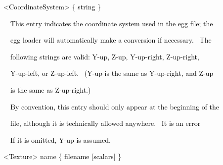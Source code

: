\documentclass[a4paper]{article}
\newcommand\textstyleOOoComputerKeyWord[1]{\textrm{\textcolor[rgb]{0.0,0.0,0.5019608}{#1}}}
\newcommand\textstyleOOoAssemblerSpecialChar[1]{\textrm{\textcolor[rgb]{0.0,0.5019608,0.0}{#1}}}
\newcommand\textstyleOOoAssemblerIdent[1]{\textrm{\textcolor{black}{#1}}}
\newcommand\textstyleOOoAssemblerDirective[1]{\textrm{\textcolor[rgb]{0.0,0.5019608,1.0}{#1}}}
\begin{document}
\bigskip


\bigskip

{\color{black}
\textstyleOOoAssemblerSpecialChar{{\textless}}\textstyleOOoAssemblerIdent{CoordinateSystem}\textstyleOOoAssemblerSpecialChar{{\textgreater}}\textstyleOOoComputerKeyWord{\textcolor{black}{
}}\textstyleOOoAssemblerSpecialChar{\{}\textstyleOOoComputerKeyWord{\textcolor{black}{
}}\textstyleOOoAssemblerIdent{string}\textstyleOOoComputerKeyWord{\textcolor{black}{
}}\textstyleOOoAssemblerSpecialChar{\}}}


\bigskip

{\color{black}
\textstyleOOoComputerKeyWord{\textcolor{black}{\ \ This entry indicates the coordinate system used in the egg file;
the}}}

{\color{black}
\textstyleOOoComputerKeyWord{\textcolor{black}{\ \ egg loader will automatically make a conversion if necessary.
\ The}}}

{\color{black}
\textstyleOOoComputerKeyWord{\textcolor{black}{\ \ following strings are valid: Y-up, Z-up, Y-up-right, Z-up-right,}}}

{\color{black}
\textstyleOOoComputerKeyWord{\textcolor{black}{\ \ Y-up-left, or Z-up-left. \ (Y-up is the same as Y-up-right, and
Z-up}}}

{\color{black}
\textstyleOOoComputerKeyWord{\textcolor{black}{\ \ is the same as Z-up-right.)}}}


\bigskip

{\color{black}
\textstyleOOoComputerKeyWord{\textcolor{black}{\ \ By convention, this entry should only appear at the beginning of
the}}}

{\color{black}
\textstyleOOoComputerKeyWord{\textcolor{black}{\ \ file, although it is technically allowed anywhere. \ It is an
error}}}

\clearpage{\color{black}
\textstyleOOoComputerKeyWord{\textcolor{black}{\ \ to include more than one coordinate system entry in the same file.}}}

{\color{black}
\textstyleOOoComputerKeyWord{\textcolor{black}{\ \ If it is omitted, Y-up is assumed.}}}


\bigskip


\bigskip

{\color{black}
\textstyleOOoAssemblerSpecialChar{{\textless}}\textstyleOOoAssemblerIdent{Texture}\textstyleOOoAssemblerSpecialChar{{\textgreater}}\textstyleOOoComputerKeyWord{\textcolor{black}{
}}\textstyleOOoAssemblerDirective{name}\textstyleOOoComputerKeyWord{\textcolor{black}{
}}\textstyleOOoAssemblerSpecialChar{\{}\textstyleOOoComputerKeyWord{\textcolor{black}{
}}\textstyleOOoAssemblerIdent{filename}\textstyleOOoComputerKeyWord{\textcolor{black}{
}}\textstyleOOoAssemblerSpecialChar{[}\textstyleOOoAssemblerIdent{scalars}\textstyleOOoAssemblerSpecialChar{]}\textstyleOOoComputerKeyWord{\textcolor{black}{
}}\textstyleOOoAssemblerSpecialChar{\}}}
\end{document}
